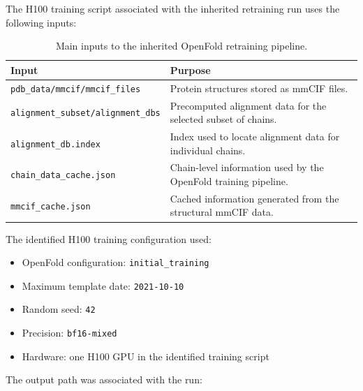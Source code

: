 \documentclass[11pt,a4paper]{article}
\begin{document}
The H100 training script associated with the inherited retraining run uses the following inputs:

\begin{table}[h]
\centering
\begin{tabular}{
>{\raggedright\arraybackslash}p{}
>{\raggedright\arraybackslash}p{}}
\toprule
\textbf{Input} & \textbf{Purpose} \\
\midrule

\texttt{pdb\_data/mmcif/mmcif\_files} &
Protein structures stored as mmCIF files. \\

\texttt{alignment\_subset/alignment\_dbs} &
Precomputed alignment data for the selected subset of chains. \\

\texttt{alignment\_db.index} &
Index used to locate alignment data for individual chains. \\

\texttt{chain\_data\_cache.json} &
Chain-level information used by the OpenFold training pipeline. \\

\texttt{mmcif\_cache.json} &
Cached information generated from the structural mmCIF data. \\

\bottomrule
\end{tabular}
\caption{Main inputs to the inherited OpenFold retraining pipeline.}
\end{table}

The identified H100 training configuration used:

\begin{itemize}[leftmargin=*]

    \item OpenFold configuration: \texttt{initial\_training}

    \item Maximum template date: \texttt{2021-10-10}

    \item Random seed: \texttt{42}

    \item Precision: \texttt{bf16-mixed}

    \item Hardware: one H100 GPU in the identified training script

\end{itemize}

The output path was associated with the run:
\end{document}
